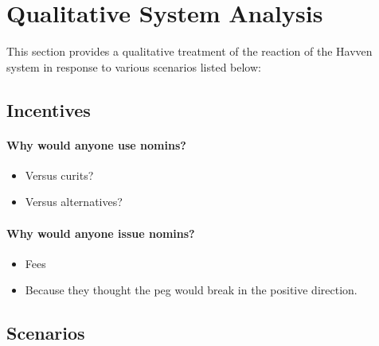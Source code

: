 
\section{Qualitative System Analysis}

This section provides a qualitative treatment of the reaction of the Havven system in response to various scenarios listed below:


\subsection{Incentives}

\paragraph{Why would anyone use nomins?}
\begin{itemize}
	\item Versus curits?
	\item Versus alternatives?
\end{itemize}

\paragraph{Why would anyone issue nomins?}
\begin{itemize}
	\item Fees
	\item Because they thought the peg would break in the positive direction.
\end{itemize}

\subsection{Scenarios}

